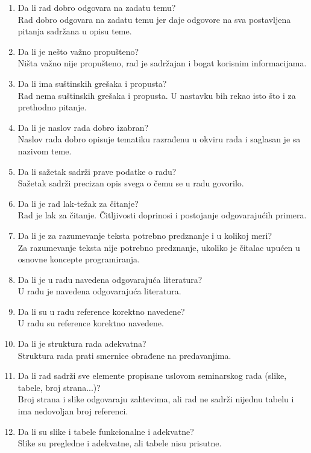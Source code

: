 \documentclass[a4paper]{report}
\begin{document}
\begin{enumerate}
\item Da li rad dobro odgovara na zadatu temu?\\
Rad dobro odgovara na zadatu temu jer daje odgovore na sva postavljena pitanja sadržana u opisu teme. 
\item Da li je nešto važno propušteno?\\
Ništa važno nije propušteno, rad je sadržajan i bogat korisnim informacijama.
\item Da li ima suštinskih grešaka i propusta?\\
Rad nema suštinskih grešaka i propusta. U nastavku bih rekao isto što i za prethodno pitanje.
\item Da li je naslov rada dobro izabran?\\
Naslov rada dobro opisuje tematiku razrađenu u okviru rada i saglasan je sa nazivom teme.
\item Da li sažetak sadrži prave podatke o radu?\\
Sažetak sadrži precizan opis svega o čemu se u radu govorilo.
\item Da li je rad lak-težak za čitanje?\\
Rad je lak za čitanje. Čitljivosti doprinosi i postojanje odgovarajućih primera.
\item Da li je za razumevanje teksta potrebno predznanje i u kolikoj meri?\\
Za razumevanje teksta nije potrebno predznanje, ukoliko je čitalac upućen u osnovne koncepte programiranja.
\item Da li je u radu navedena odgovarajuća literatura?\\
U radu je navedena odgovarajuća literatura.
\item Da li su u radu reference korektno navedene?\\
U radu su reference korektno navedene.
\item Da li je struktura rada adekvatna?\\
Struktura rada prati smernice obrađene na predavanjima.
\item Da li rad sadrži sve elemente propisane uslovom seminarskog rada (slike, tabele, broj strana...)?\\
Broj strana i slike odgovaraju zahtevima, ali rad ne sadrži nijednu tabelu i ima nedovoljan broj referenci.
\item Da li su slike i tabele funkcionalne i adekvatne?\\
Slike su pregledne i adekvatne, ali tabele nisu prisutne.
\end{enumerate}
\end{document}
